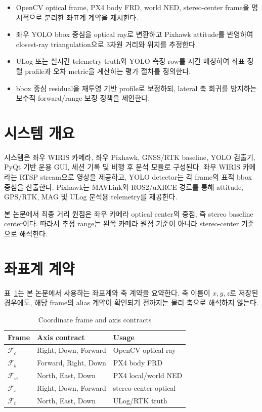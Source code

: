 \documentclass[10pt,conference]{IEEEtran}
\newcommand{\frame}[1]{\mathcal{F}_{#1}}
\begin{document}
\begin{itemize}
    \item OpenCV optical frame, PX4 body FRD, world NED, stereo-center frame을 명시적으로 분리한 좌표계 계약을 제시한다.
    \item 좌우 YOLO bbox 중심을 optical ray로 변환하고 Pixhawk attitude를 반영하여 closest-ray triangulation으로 3차원 거리와 위치를 추정한다.
    \item ULog 또는 실시간 telemetry truth와 YOLO 측정 row를 시간 매칭하여 좌표 정렬 profile과 오차 metric을 계산하는 평가 절차를 정의한다.
    \item bbox 중심 residual을 재투영 기반 profile로 보정하되, lateral 축 회귀를 방지하는 보수적 forward/range 보정 정책을 제안한다.
\end{itemize}

\section{시스템 개요}

시스템은 좌우 WIRIS 카메라, 좌우 Pixhawk, GNSS/RTK baseline, YOLO 검출기, PyQt 기반 운용 GUI, 세션 기록 및 비행 후 분석 모듈로 구성된다.
좌우 WIRIS 카메라는 RTSP stream으로 영상을 제공하고, YOLO detector는 각 frame의 표적 bbox 중심을 산출한다.
Pixhawk는 MAVLink와 ROS2/uXRCE 경로를 통해 attitude, GPS/RTK, MAG 및 ULog 분석용 telemetry를 제공한다.

본 논문에서 최종 거리 원점은 좌우 카메라 optical center의 중점, 즉 stereo baseline center이다.
따라서 추정 range는 왼쪽 카메라 원점 기준이 아니라 stereo-center 기준으로 해석한다.

\section{좌표계 계약}

표~\ref{tab:frames}는 본 논문에서 사용하는 좌표계와 축 계약을 요약한다.
축 이름이 $x,y,z$로 저장된 경우에도, 해당 frame의 alias 계약이 확인되기 전까지는 물리 축으로 해석하지 않는다.

\begin{table}[t]
\centering
\caption{Coordinate frame and axis contracts}
\label{tab:frames}
\begin{tabular}{lll}
\toprule
Frame & Axis contract & Usage \\
\midrule
$\frame{c}$ & Right, Down, Forward & OpenCV optical ray \\
$\frame{b}$ & Forward, Right, Down & PX4 body FRD \\
$\frame{w}$ & North, East, Down & PX4 local/world NED \\
$\frame{s}$ & Right, Down, Forward & stereo-center optical \\
$\frame{t}$ & North, East, Down & ULog/RTK truth \\
\bottomrule
\end{tabular}
\end{table}
\end{document}
